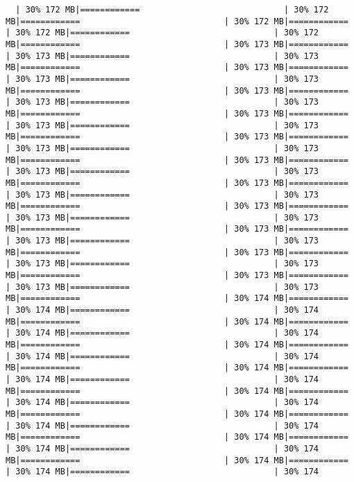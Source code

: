 \documentclass[
]{article}
\begin{document}
\begin{verbatim}
  | 30% 172 MB|============                             | 30% 172 MB|============                             | 30% 172 MB|============                             | 30% 172 MB|============                             | 30% 172 MB|============                             | 30% 173 MB|============                             | 30% 173 MB|============                             | 30% 173 MB|============                             | 30% 173 MB|============                             | 30% 173 MB|============                             | 30% 173 MB|============                             | 30% 173 MB|============                             | 30% 173 MB|============                             | 30% 173 MB|============                             | 30% 173 MB|============                             | 30% 173 MB|============                             | 30% 173 MB|============                             | 30% 173 MB|============                             | 30% 173 MB|============                             | 30% 173 MB|============                             | 30% 173 MB|============                             | 30% 173 MB|============                             | 30% 173 MB|============                             | 30% 173 MB|============                             | 30% 173 MB|============                             | 30% 173 MB|============                             | 30% 173 MB|============                             | 30% 173 MB|============                             | 30% 173 MB|============                             | 30% 173 MB|============                             | 30% 173 MB|============                             | 30% 173 MB|============                             | 30% 173 MB|============                             | 30% 173 MB|============                             | 30% 173 MB|============                             | 30% 173 MB|============                             | 30% 173 MB|============                             | 30% 173 MB|============                             | 30% 174 MB|============                             | 30% 174 MB|============                             | 30% 174 MB|============                             | 30% 174 MB|============                             | 30% 174 MB|============                             | 30% 174 MB|============                             | 30% 174 MB|============                             | 30% 174 MB|============                             | 30% 174 MB|============                             | 30% 174 MB|============                             | 30% 174 MB|============                             | 30% 174 MB|============                             | 30% 174 MB|============                             | 30% 174 MB|============                             | 30% 174 MB|============                             | 30% 174 MB|============                             | 30% 174 MB|============                             | 30% 174 MB|============                             | 30% 174 MB|============                             | 30% 174 MB|============                             | 30% 174 MB|============                             | 30% 174 MB|============                             | 30% 174 MB|============                             | 30% 174 
\end{verbatim}
\end{document}
